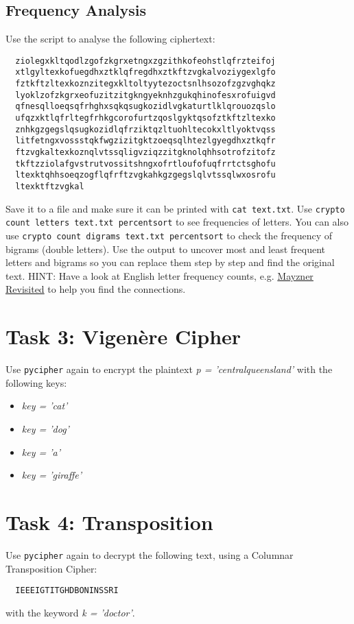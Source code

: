 \documentclass{article}
\begin{document}
\subsection{Frequency Analysis}
Use the script to analyse the following ciphertext:
\begin{lstlisting}
  ziolegxkltqodlzgofzkgrxetngxzgzithkofeohstlqfrzteifoj
  xtlgyltexkofuegdhxztklqfregdhxztkftzvgkalvoziygexlgfo
  fztkftzltexkoznzitegxkltoltyytezoctsnlhsozofzgzvghqkz
  lyoklzofzkgrxeofuzitzitgkngyeknhzgukqhinofesxrofuigvd
  qfnesqlloeqsqfrhghxsqkqsugkozidlvgkaturtlklqrouozqslo
  ufqzxktlqfrltegfrhkgcorofurtzqoslgyktqsofztkftzltexko
  znhkgzgegslqsugkozidlqfrziktqzltuohltecokxltlyoktvqss
  litfetngxvossstqkfwgzizitgktzoeqsqlhtezlgyegdhxztkqfr
  ftzvgkaltexkoznqlvtssqligvziqzzitgknolqhhsotrofzitofz
  tkftzziolafgvstrutvossitshngxofrtloufofuqfrrtctsghofu
  ltexktqhhsoeqzogflqfrftzvgkahkgzgegslqlvtssqlwxosrofu
  ltexktftzvgkal
\end{lstlisting}
Save it to a file and make sure it can be printed with \texttt{cat text.txt}. Use \texttt{crypto count letters text.txt percentsort} to see frequencies of letters. You can also use \texttt{crypto count digrams text.txt percentsort} to check the frequency of bigrams (double letters). Use the output to uncover most and least frequent letters and bigrams so you can replace them step by step and find the original text. HINT: Have a look at English letter frequency counts, e.g. \href{http://norvig.com/mayzner.html}{Mayzner Revisited} to help you find the connections.

\section{Task 3: Vigen\`{e}re Cipher}
Use \texttt{pycipher} again to encrypt the plaintext \textit{p = 'centralqueensland'} with the following keys:
\begin{itemize}
  \item \textit{key = 'cat'}
  \item \textit{key = 'dog'}
  \item \textit{key = 'a'}
  \item \textit{key = 'giraffe'}
\end{itemize}

\section{Task 4: Transposition}
Use \texttt{pycipher} again to decrypt the following text, using a Columnar Transposition Cipher:
\begin{lstlisting}
  IEEEIGTITGHDBONINSSRI
\end{lstlisting}
with the keyword \textit{k = 'doctor'}.
\end{document}

